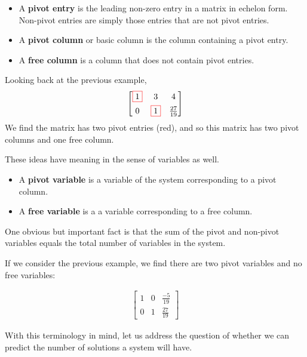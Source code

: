 \documentclass[11pt]{article}
\newcommand{\keyphrase}{\textbf}
\newcommand{\boxit}[2]{\textcolor{#1}{\boxed{\textcolor{black}{#2}}}}
\begin{document}
\begin{itemize}
\item{
A \keyphrase{pivot entry} is the leading non-zero entry in a matrix in echelon form. Non-pivot entries are simply those entries that are not pivot entries.
}
\item{
A \keyphrase{pivot column} or basic column is the column containing a pivot entry.
}
\item{
A \keyphrase{free column} is a column that does not contain pivot entries.
}
\end{itemize}

Looking back at the previous example,
\begin{align*}
\left[\begin{matrix}
\boxit{red}{1} & 3 & 4
\\[.4em]
0 & \boxit{red}{1} & \frac{27}{19}
\end{matrix}\right]
\end{align*}
We find the matrix has two pivot entries (red), and so this matrix has two pivot columns and one free column.


These ideas have meaning in the sense of variables as well.
\begin{itemize}
\item{
A \keyphrase{pivot variable} is a variable of the system corresponding to a pivot column.
}
\item{
A \keyphrase{free variable} is a a variable corresponding to a free column.
}
\end{itemize}
One obvious but important fact is that the sum of the pivot and non-pivot variables equals the total number of variables in the system.

If we consider the previous example, we find there are two pivot variables and no free variables:

\begin{align*}
\left[\begin{matrix}
1 & 0 & \frac{-5}{19}
\\[.4em]
0 & 1 & \frac{27}{19}
\end{matrix}\right]
\end{align*}

With this terminology in mind, let us address the question of whether we can predict the number of solutions a system will have.
\end{document}
